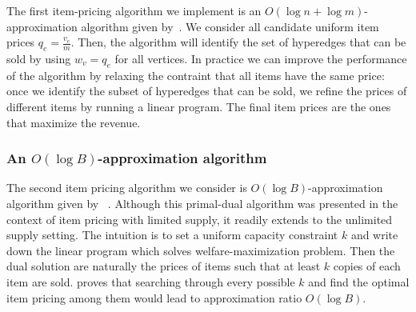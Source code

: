 The first item-pricing algorithm we implement is an $O(\log n+\log m)$-approximation algorithm given by~\cite{guruswami2005profit}. We consider all candidate uniform item prices $q_e = \frac{v_e}{m}$. Then, the algorithm will identify the set of hyperedges that can be sold by using $w_v = q_e$ for all vertices. In practice we can improve the performance of the algorithm by relaxing the contraint that all items have the same price: once we identify the subset of hyperedges that can be sold, we refine the prices of different items by running a linear program. The final item prices are the ones that maximize the revenue. 

\subsubsection{An $O(\log B)$-approximation algorithm}

The second item pricing algorithm we consider is $O(\log B)$-approximation algorithm given by ~\cite{cheung2008approximation}. Although this primal-dual algorithm was presented in the context of item pricing with limited supply, it readily extends to the unlimited supply setting. The intuition is to set a uniform capacity constraint $k$ and write down the linear program which solves welfare-maximization problem. Then the dual solution are naturally the prices of items such that at least $k$ copies of each item are sold. \cite{cheung2008approximation} proves that
searching through every possible $k$ and find the optimal item pricing among them would lead to approximation ratio $O(\log B)$.

%		
%		

